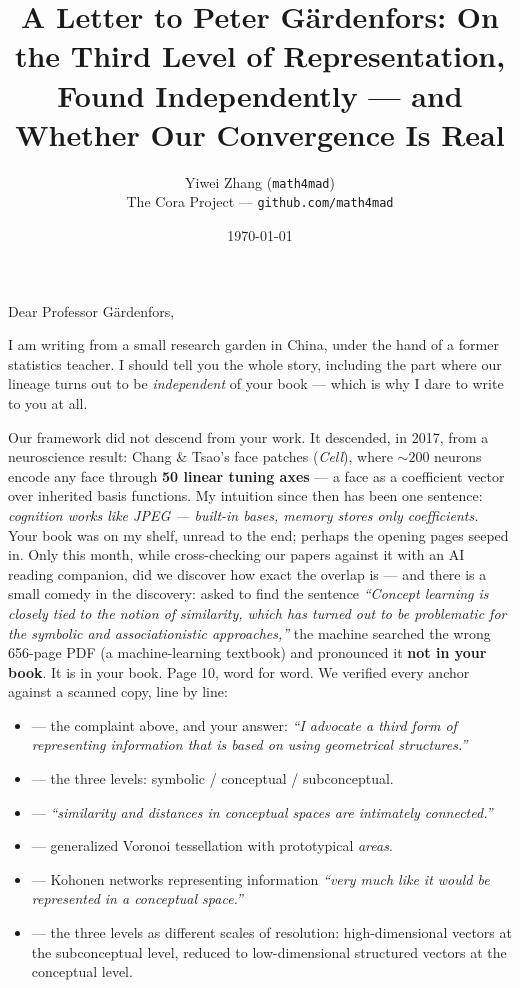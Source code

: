 \documentclass[11pt, a4paper]{article}
\title{\textbf{A Letter to Peter G\"ar\-den\-fors: On the Third Level of Representation, Found Independently --- and Whether Our Convergence Is Real}}
\author{Yiwei Zhang (\texttt{math4mad}) \\ \small The Cora Project --- \texttt{github.com/math4mad}}
\date{\today}
\begin{document}
\maketitle

Dear Professor G\"ardenfors,

I am writing from a small research garden in China, under the hand of a former statistics teacher. I should tell you the whole story, including the part where our lineage turns out to be \textit{independent} of your book --- which is why I dare to write to you at all.

Our framework did not descend from your work. It descended, in 2017, from a neuroscience result: Chang \& Tsao's face patches (\textit{Cell}), where ${\sim}200$ neurons encode any face through \textbf{50 linear tuning axes} --- a face as a coefficient vector over inherited basis functions. My intuition since then has been one sentence: \textit{cognition works like JPEG --- built-in bases, memory stores only coefficients.} Your book was on my shelf, unread to the end; perhaps the opening pages seeped in. Only this month, while cross-checking our papers against it with an AI reading companion, did we discover how exact the overlap is --- and there is a small comedy in the discovery: asked to find the sentence \textit{``Concept learning is closely tied to the notion of similarity, which has turned out to be problematic for the symbolic and associationistic approaches,''} the machine searched the wrong 656-page PDF (a machine-learning textbook) and pronounced it \textbf{not in your book}. It is in your book. Page 10, word for word. We verified every anchor against a scanned copy, line by line:

\begin{itemize}
  \item[\textbf{p.10}] --- the complaint above, and your answer: \textit{``I advocate a third form of representing information that is based on using geometrical structures.''}
  \item[\textbf{p.52}] --- the three levels: symbolic / conceptual / subconceptual.
  \item[\textbf{p.136}] --- \textit{``similarity and distances in conceptual spaces are intimately connected.''}
  \item[\textbf{p.166}] --- generalized Voronoi tessellation with prototypical \textit{areas}.
  \item[\textbf{p.278}] --- Kohonen networks representing information \textit{``very much like it would be represented in a conceptual space.''}
  \item[\textbf{p.293}] --- the three levels as different scales of resolution: high-dimensional vectors at the subconceptual level, reduced to low-dimensional structured vectors at the conceptual level.
\end{itemize}
\end{document}
